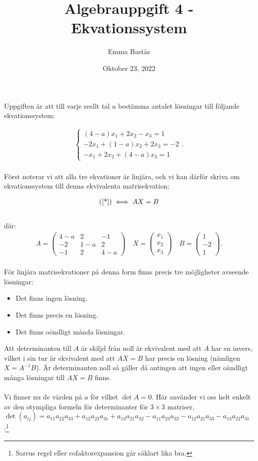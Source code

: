 \documentclass{article}
\title{Algebrauppgift 4 - Ekvationssystem}
\author{Emma Bastås}
\date{Oktober 23, 2022}
\begin{document}
\maketitle

\noindent Uppgiften är att till varje reellt tal $a$ bestämma antalet lösningar till följande ekvationssystem:

\begin{gather*}
  \begin{cases}
  (4 - a)x_{1} + 2x_{2} - x_{3} = 1\\
  -2x_{1} + (1 - a)x_{2} + 2x_{3} = -2\\
  -x_{1} + 2x_{2} + (4 - a)x_{3} = 1
  \end{cases}\text{.} \tag{$\star$}\label{*}
\end{gather*}
\\
Först noterar vi att alla tre ekvationer är linjära, och vi kan därför skriva om ekvationssystem till denna ekvivalenta matrisekvation:

\begin{gather*}
  \text{(\ref{*})} \iff AX = B
\end{gather*}
\\
där:
\begin{gather*}
  A =
  \begin{pmatrix}
    4 - a & 2 & - 1 \\
    -2 & 1 - a & 2 \\
    -1 & 2 & 4 - a
  \end{pmatrix}\quad
  X =
  \begin{pmatrix}
    x_{1} \\
    x_{2} \\
    x_{3}
  \end{pmatrix}\quad
  B =
  \begin{pmatrix}
    1 \\
    -2 \\
    1
  \end{pmatrix}\text{.}
\end{gather*}
\\
För linjära matrisekvationer på denna form finns precis tre möjligheter avseende lösningar:
\begin{itemize}
  \item Det finns ingen lösning.
  \item Det finns precis en lösning.
  \item Det finns oöndligt månda lösningar.
\end{itemize}

\noindent Att determinanten till $A$ är skiljd från noll är ekvivalent med att $A$ har en invers, vilket i sin tur är ekvivalent med att $AX = B$ har precis en lösning (nämligen $X = A^{-1}B$). Är determinanten noll så gäller då antingen att ingen eller oändligt många lösningar till $AX = B$ finns.
\\
\\
Vi finner nu de värden på $a$ för vilket $\det A = 0$. Här använder vi oss helt enkelt av den otympliga formeln för determinanter för $3\times3$ matriser, $\det (a_{ij}) = a_{11} a_{22} a_{33} + a_{12} a_{23} a_{31} + a_{13} a_{21} a_{32} - a_{11} a_{23} a_{32} - a_{12} a_{21} a_{33} - a_{13} a_{22} a_{31} $:\footnote{Sarrus regel eller cofaktorexpansion går såklart lika bra.}
\end{document}
